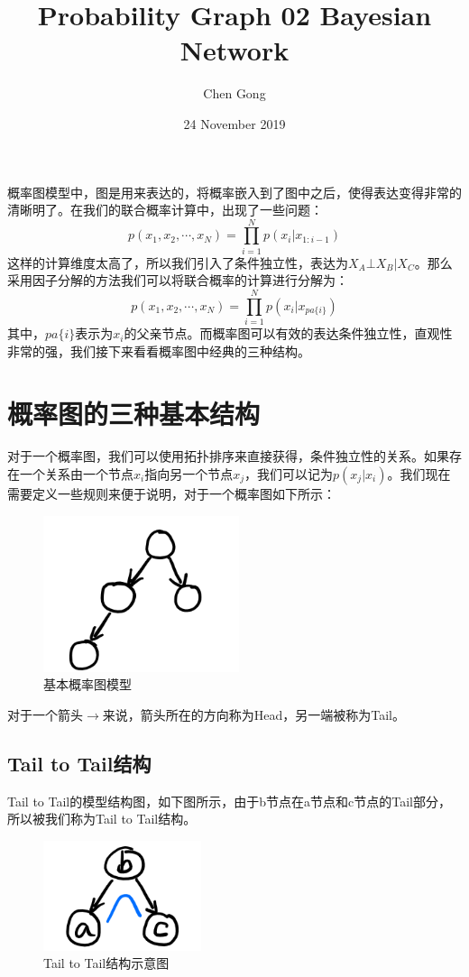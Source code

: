 \documentclass[a4paper]{article}
\title{Probability Graph 02 Bayesian Network}
\author{Chen Gong}
\date{24 November 2019}
\begin{document}
\maketitle

概率图模型中，图是用来表达的，将概率嵌入到了图中之后，使得表达变得非常的清晰明了。在我们的联合概率计算中，出现了一些问题：
\begin{equation}
    p(x_1,x_2,\cdots,x_N)=\prod_{i=1}^Np(x_i|x_{1:i-1})
\end{equation}
这样的计算维度太高了，所以我们引入了条件独立性，表达为$X_A\bot X_B | X_C$。那么采用因子分解的方法我们可以将联合概率的计算进行分解为：
\begin{equation}
    p(x_1,x_2,\cdots,x_N)=\prod_{i=1}^Np(x_i|x_{pa\{i\}})
\end{equation}
其中，$pa\{i\}$表示为$x_i$的父亲节点。而概率图可以有效的表达条件独立性，直观性非常的强，我们接下来看看概率图中经典的三种结构。


\section{概率图的三种基本结构}
对于一个概率图，我们可以使用拓扑排序来直接获得，条件独立性的关系。如果存在一个关系由一个节点$x_i$指向另一个节点$x_j$，我们可以记为$p(x_j|x_i)$。我们现在需要定义一些规则来便于说明，对于一个概率图如下所示：
\begin{figure}[H]
    \centering
    \includegraphics[width=.35\textwidth]{微信图片_20191124100458.png}
    \caption{基本概率图模型}
    
\end{figure}
对于一个箭头$\longrightarrow$来说，箭头所在的方向称为Head，另一端被称为Tail。

\subsection{Tail to Tail结构}
Tail to Tail的模型结构图，如下图所示，由于b节点在a节点和c节点的Tail部分，所以被我们称为Tail to Tail结构。
\begin{figure}[H]
    \centering
    \includegraphics[width=.35\textwidth]{微信图片_20191124101337.png}
    \caption{Tail to Tail结构示意图}
    
\end{figure}
\end{document}
